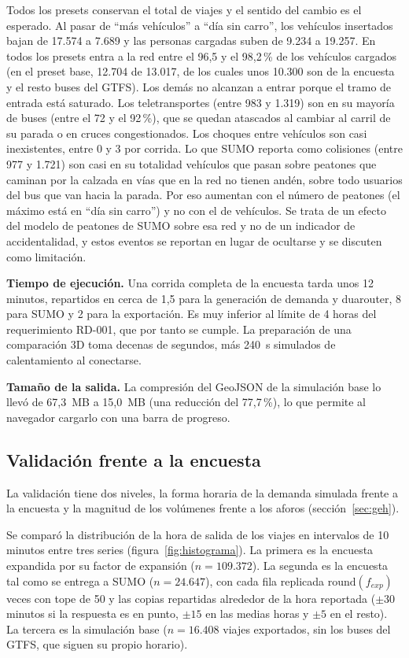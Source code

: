 Todos los presets conservan el total de viajes y el sentido del cambio es el esperado. Al pasar de “más vehículos” a “día sin carro”, los vehículos insertados bajan de 17.574 a 7.689 y las personas cargadas suben de 9.234 a 19.257. En todos los presets entra a la red entre el 96,5 y el 98,2\,\% de los vehículos cargados (en el preset base, 12.704 de 13.017, de los cuales unos 10.300 son de la encuesta y el resto buses del GTFS). Los demás no alcanzan a entrar porque el tramo de entrada está saturado. Los teletransportes (entre 983 y 1.319) son en su mayoría de buses (entre el 72 y el 92\,\%), que se quedan atascados al cambiar al carril de su parada o en cruces congestionados. Los choques entre vehículos son casi inexistentes, entre 0 y 3 por corrida. Lo que SUMO reporta como colisiones (entre 977 y 1.721) son casi en su totalidad vehículos que pasan sobre peatones que caminan por la calzada en vías que en la red no tienen andén, sobre todo usuarios del bus que van hacia la parada. Por eso aumentan con el número de peatones (el máximo está en “día sin carro”) y no con el de vehículos. Se trata de un efecto del modelo de peatones de SUMO sobre esa red y no de un indicador de accidentalidad, y estos eventos se reportan en lugar de ocultarse y se discuten como limitación.

\textbf{Tiempo de ejecución.} Una corrida completa de la encuesta tarda unos 12 minutos, repartidos en cerca de 1,5 para la generación de demanda y duarouter, 8 para SUMO y 2 para la exportación. Es muy inferior al límite de 4 horas del requerimiento RD-001, que por tanto se cumple. La preparación de una comparación 3D toma decenas de segundos, más 240~s simulados de calentamiento al conectarse.

\textbf{Tamaño de la salida.} La compresión del GeoJSON de la simulación base lo llevó de 67,3~MB a 15,0~MB (una reducción del 77,7\,\%), lo que permite al navegador cargarlo con una barra de progreso.

\subsection{Validación frente a la encuesta}

La validación tiene dos niveles, la forma horaria de la demanda simulada frente a la encuesta y la magnitud de los volúmenes frente a los aforos (sección~\ref{sec:geh}).

Se comparó la distribución de la hora de salida de los viajes en intervalos de 10 minutos entre tres series (figura~\ref{fig:histograma}). La primera es la encuesta expandida por su factor de expansión ($n=109.372$). La segunda es la encuesta tal como se entrega a SUMO ($n=24.647$), con cada fila replicada $\mathrm{round}(f_{exp})$ veces con tope de 50 y las copias repartidas alrededor de la hora reportada ($\pm 30$ minutos si la respuesta es en punto, $\pm 15$ en las medias horas y $\pm 5$ en el resto). La tercera es la simulación base ($n=16.408$ viajes exportados, sin los buses del GTFS, que siguen su propio horario).

